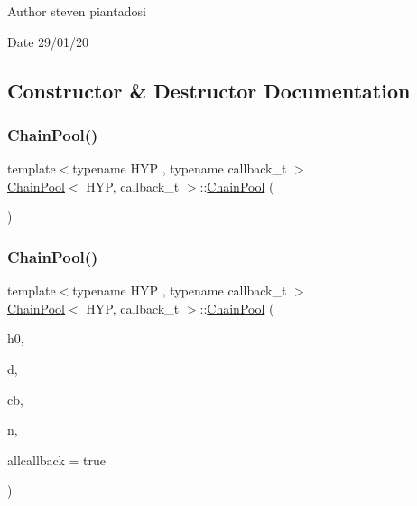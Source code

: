 \begin{DoxyAuthor}{Author}
steven piantadosi 
\end{DoxyAuthor}
\begin{DoxyDate}{Date}
29/01/20 
\end{DoxyDate}


\subsection{Constructor \& Destructor Documentation}
\mbox{\label{class_chain_pool_ae8795a9a7c0fff45c82334fa821c8c3c}} 
\subsubsection{\texorpdfstring{Chain\+Pool()}{ChainPool()}\hspace{0.1cm}{\footnotesize\ttfamily [1/2]}}
{\footnotesize\ttfamily template$<$typename H\+YP , typename callback\+\_\+t $>$ \\
\hyperlink{class_chain_pool}{Chain\+Pool}$<$ H\+YP, callback\+\_\+t $>$\+::\hyperlink{class_chain_pool}{Chain\+Pool} (\begin{DoxyParamCaption}{ }\end{DoxyParamCaption})\hspace{0.3cm}{\ttfamily [inline]}}

\mbox{\label{class_chain_pool_a7794efde5588ecbf3603170d6226cd6f}} 
\subsubsection{\texorpdfstring{Chain\+Pool()}{ChainPool()}\hspace{0.1cm}{\footnotesize\ttfamily [2/2]}}
{\footnotesize\ttfamily template$<$typename H\+YP , typename callback\+\_\+t $>$ \\
\hyperlink{class_chain_pool}{Chain\+Pool}$<$ H\+YP, callback\+\_\+t $>$\+::\hyperlink{class_chain_pool}{Chain\+Pool} (\begin{DoxyParamCaption}\item[{H\+YP \&}]{h0,  }\item[{typename H\+Y\+P\+::data\+\_\+t $\ast$}]{d,  }\item[{callback\+\_\+t \&}]{cb,  }\item[{size\+\_\+t}]{n,  }\item[{bool}]{allcallback = {\ttfamily true} }\end{DoxyParamCaption})\hspace{0.3cm}{\ttfamily [inline]}}



